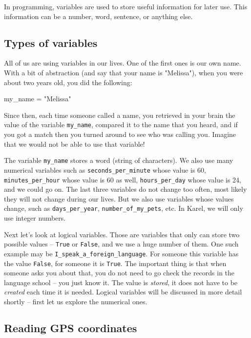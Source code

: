 \noindent
In programming, variables are used to store useful information for later use. This information can 
be a number, word, sentence, or anything else. 

\subsection{Types of variables}

All of us are using variables in our lives. One of 
the first ones is our own name. With a bit of abstraction (and say that your name is "Melissa"), 
when you were about two years old, you did the following:

\begin{bluecode}
my_name = "Melissa"
\end{bluecode}
Since then, each time someone called a name, you retrieved in your brain the value of the variable
{\tt my\_name}, compared it to the name that you heard, and if you got a match then you turned around 
to see who was calling you. Imagine that we would not be able to use that variable!

The variable {\tt my\_name} stores a word (string of characters). We also use many numerical variables such as
{\tt seconds\_per\_minute} whose value is 60, {\tt minutes\_per\_hour} whose value is 60 as well, 
{\tt hours\_per\_day} whose value is 24, and we could go on. The last three variables do not change 
too often, most likely they will not change during our lives. But we also use variables whose 
values change, such as {\tt days\_per\_year}, {\tt number\_of\_my\_pets}, etc. In Karel, we
will only use integer numbers.

Next let's look at logical variables. Those are variables that only can store two possible values --
{\tt True} or {\tt False}, and we use a huge number of them. One such example may be {\tt I\_speak\_a\_foreign\_language}.
For someone this variable has the value {\tt False}, for someone it is {\tt True}. The important 
thing is that when someone asks you about that, you do not need to go check the records in the language 
school -- you just know it. The value is {\em stored}, it does not have to be {\em created} each time 
it is needed. Logical variables will be discussed in more detail shortly -- first let us explore 
the numerical ones.

\subsection{Reading GPS coordinates}

